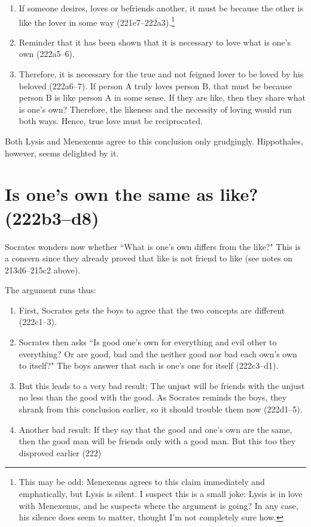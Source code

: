\documentclass[11pt]{article}
\begin{document}
\begin{enumerate}
    \item If someone desires, loves or befriends another, it must be because the other is like the lover in some way (221e7--222a3).\footnote{This may be odd: Menexenus agrees to this claim immediately and emphatically, but Lysis is silent.  I suspect this is a small joke: Lysis is in love with Menexenus, and he suspects where the argument is going?  In any case, his silence does seem to matter, thought I'm not completely sure how.}
    \item Reminder that it has been shown that it is necessary to love what is one's own (222a5--6).
    \item Therefore, it is necessary for the true and not feigned lover to be loved by his beloved (222a6--7).  If person A truly loves person B, that must be because person B is like person A in some sense.  If they are like, then they share what is one's own?  Therefore, the likeness and the necessity of loving would run both ways.  Hence, true love must be reciprocated.
\end{enumerate}

Both Lysis and Menexenus agree to this conclusion only grudgingly.  Hippothales, however, seems delighted by it.

\section{Is one's own the same as like? (222b3--d8)}

Socrates wonders now whether ``What is one's own differs from the like?"  This is a concern since they already proved that like is not friend to like (see notes on 213d6--215c2 above).

The argument runs thus:

\begin{enumerate}
    \item First, Socrates gets the boys to agree that the two concepts are different (222c1--3).
    \item Socrates then asks ``Is good one's own for everything and evil other to everything? Or are good, bad and the neither good nor bad each own's own to itself?"  The boys answer that each is one's one for itself (222c3--d1).
    \item But this leads to a very bad result: The unjust will be friends with the unjust no less than the good with the good.  As Socrates reminds the boys, they shrank from this conclusion earlier, so it should trouble them now (222d1--5).
    \item Another bad result: If they say that the good and one's own are the same, then the good man will be friends only with a good man.  But this too they disproved earlier (222)
\end{enumerate}
\end{document}
